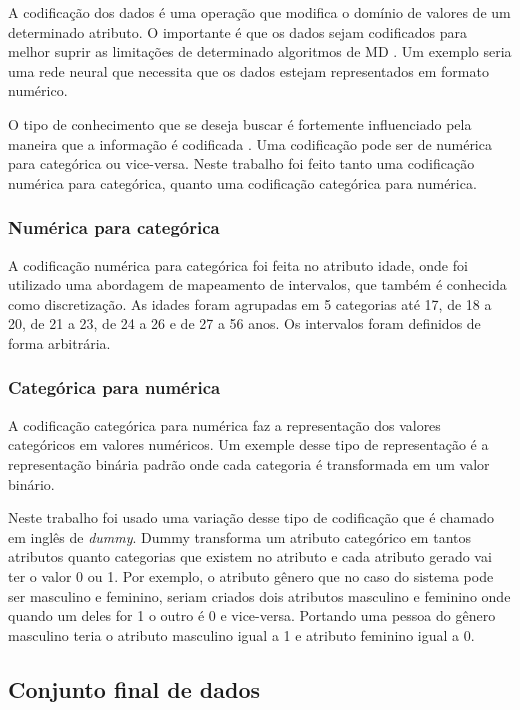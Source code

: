 \documentclass[diss,capa]{texufpel}
\begin{document}
A codificação dos dados é uma operação que modifica o domínio de valores de um determinado atributo.
O importante é que os dados sejam codificados para melhor suprir as limitações de determinado algoritmos de MD \cite{goldschmidt2015data}. Um exemplo seria uma rede neural que necessita que os dados estejam representados em formato numérico.

O tipo de conhecimento que se deseja buscar é fortemente influenciado pela maneira que a informação é codificada \cite{goldschmidt2015data}. Uma codificação pode ser de numérica para categórica ou vice-versa. Neste trabalho foi feito tanto uma codificação numérica para categórica, quanto uma codificação categórica para numérica.

\subsubsection{Numérica para categórica}

A codificação numérica para categórica foi feita no atributo idade, onde foi utilizado uma abordagem de mapeamento de intervalos, que também é conhecida como discretização.
As idades foram agrupadas em 5 categorias até 17, de 18 a 20, de 21 a 23, de 24 a 26 e de 27 a 56 anos.
Os intervalos foram definidos de forma arbitrária.

\subsubsection{Categórica para numérica}

A codificação categórica para numérica faz a representação dos valores categóricos em valores numéricos.
Um exemple desse tipo de representação é a representação binária padrão onde cada categoria é transformada em um valor binário.

Neste trabalho foi usado uma variação desse tipo de codificação que é chamado em inglês de \textit{dummy}.
Dummy transforma um atributo categórico em tantos atributos quanto categorias que existem no atributo e cada atributo gerado vai ter o valor 0 ou 1.
Por exemplo, o atributo gênero que no caso do sistema pode ser masculino e feminino, seriam criados dois atributos masculino e feminino onde quando um deles for 1 o outro é 0 e vice-versa. Portando uma pessoa do gênero masculino teria o atributo masculino igual a 1 e atributo feminino igual a 0.

\subsection{Conjunto final de dados}
\end{document}
